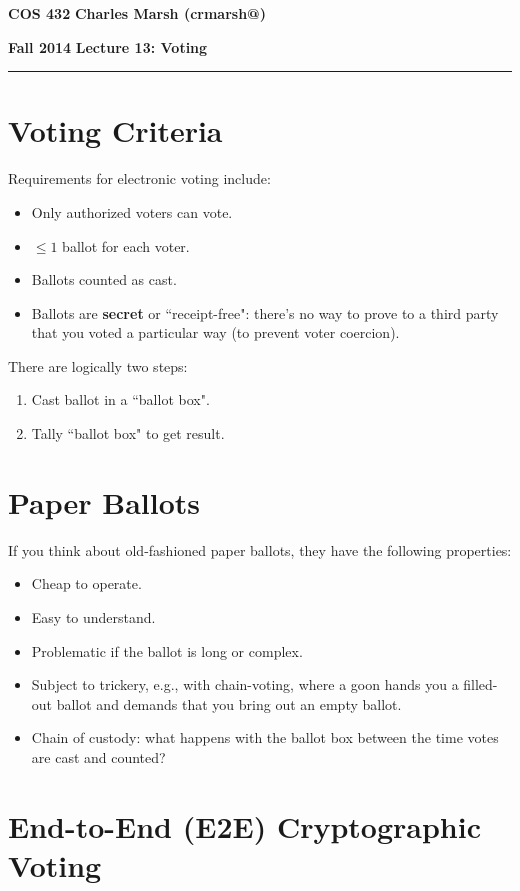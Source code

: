 \documentclass[12pt]{article}
\makeatletter
\newcommand{\myheader}[4]
{\vspace*{-0.5in}
\noindent
{#1} \hfill {#3}

\noindent
{#2} \hfill {#4}

\noindent
\rule[8pt]{\textwidth}{1pt}

\vspace{1ex} 
}  %
\newcommand{\myalgsheader}[0]
{\myheader
{ {\bf{COS 432}} }
{ {\bf{Fall 2014}} }
{ {\bf{Charles Marsh (crmarsh@)}} }
{ {\bf{Lecture 13: Voting}} }
}
\makeatother
\begin{document}
\myalgsheader

\pagestyle{plain}

\section*{Voting Criteria}

Requirements for electronic voting include:
\begin{itemize}
\item Only authorized voters can vote.
\item $\leq 1$ ballot for each voter.
\item Ballots counted as cast.
\item Ballots are \textbf{secret} or ``receipt-free": there's no way to prove to a third party that you voted a particular way (to prevent voter coercion).
\end{itemize}

There are logically two steps:
\begin{enumerate}
\item Cast ballot in a ``ballot box".
\item Tally ``ballot box" to get result.
\end{enumerate}

\section*{Paper Ballots}

If you think about old-fashioned paper ballots, they have the following properties:
\begin{itemize}
\item Cheap to operate.
\item Easy to understand.
\item Problematic if the ballot is long or complex.
\item Subject to trickery, e.g., with chain-voting, where a goon hands you a filled-out ballot and demands that you bring out an empty ballot.
\item Chain of custody: what happens with the ballot box between the time votes are cast and counted?
\end{itemize}

\section*{End-to-End (E2E) Cryptographic Voting}
\end{document}
